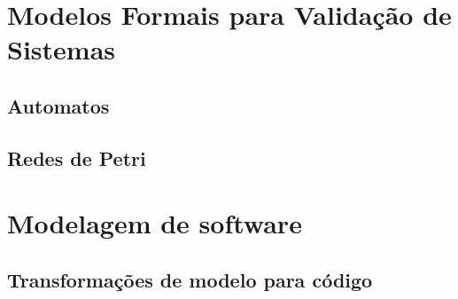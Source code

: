 \section{Modelos Formais para Validação de Sistemas}
\subsection{Automatos}
\subsection{Redes de Petri}

\section{Modelagem de software}
\subsection{Transformações de modelo para código}
